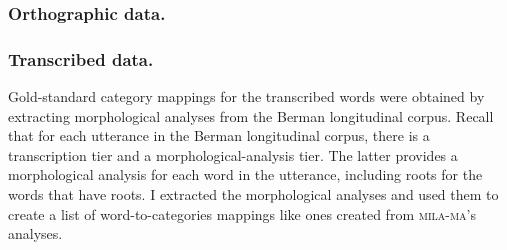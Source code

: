 \subsubsection{Orthographic data.}

%
%

\subsubsection{Transcribed data.} Gold-standard category mappings for the 
transcribed words were obtained by extracting morphological analyses from the Berman 
longitudinal corpus. Recall that for each utterance in the Berman longitudinal corpus, 
there is a transcription tier and a morphological-analysis tier. The latter provides a 
morphological analysis for each word in the utterance, including roots for the words 
that have roots. I extracted the morphological analyses and used them to create a list of 
word-to-categories mappings like ones created from \textsc{mila-ma}'s analyses.
